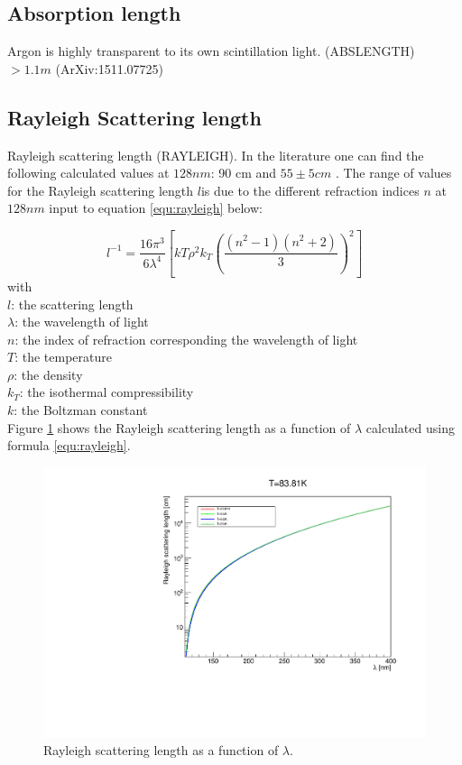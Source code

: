 \documentclass{article}
\begin{document}
\subsection{Absorption length}
Argon is highly transparent to its own scintillation light. (ABSLENGTH)
  $> 1.1 m$  (ArXiv:1511.07725) 
  \subsection{Rayleigh Scattering length}
  Rayleigh scattering length (RAYLEIGH). In the literature one can find the following calculated values at $128 nm$:  90 cm \cite{ref:vg}
  and $55\pm  5 cm$ \cite{ref:grace}. The  range of values for the Rayleigh
scattering length $l$is due to the different refraction indices $n$ at $128nm$  input  to equation  \ref{equ:rayleigh} below:

  \begin{equation}
l^{-1} = \frac{16\pi^3}{6\lambda^4} \left[ kT \rho^2 k_T \left( \frac{(n^2 - 1)(n^2 + 2)}{3} \right)^2\right]
  \label{equ:rayleigh}
\end{equation}
\noindent
    with\\
    $l$: the scattering length\\
    $\lambda$:  the wavelength of light\\
    $n$: the index of refraction corresponding the wavelength of light\\
    $T$: the temperature \\
    $\rho$: the density \\
    $k_T$: the isothermal compressibility\\
    $k$: the Boltzman constant\\

Figure \ref{fig:rayleigh} shows the Rayleigh scattering length as a function of $\lambda$ calculated using formula \ref{equ:rayleigh}.

  
  \begin{figure}[ht]
    \begin{center}
      \includegraphics[width=35.5pc]{rayleigh.pdf}
    \end{center}
    \caption{\label{fig:rayleigh}Rayleigh scattering length as a function of $\lambda$.}
  \end{figure}
  \clearpage
  
\end{document}

